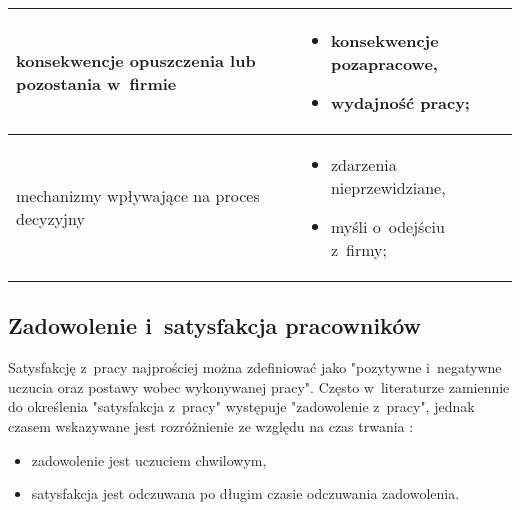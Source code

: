 \begin{minipage}{\textwidth}
\begin{table}[H]
\begin{center}
\begin{tabular}{|P{.2\textwidth}|P{.7\textwidth}|}
                         konsekwencje opuszczenia lub pozostania w~firmie &
                         \begin{itemize}
                             \item konsekwencje pozapracowe,
                             \item wydajność pracy;
                         \end{itemize} \\
                         \hline

                         mechanizmy wpływające na proces decyzyjny &
                         \begin{itemize}
                             \item zdarzenia nieprzewidziane,
                             \item myśli o~odejściu z~firmy;
                         \end{itemize} \\
                         \hline
                     \end{tabular}
                 \end{center}
                 \raggedright{}
                 \vspace{0.75cm}
             \end{table}
\end{minipage}


\subsection{Zadowolenie i~satysfakcja pracowników}\label{sec:czynniki-wplywajace-na-fluktuacje:zadowolenie}
Satysfakcję z~pracy najprościej można zdefiniować jako "pozytywne i~negatywne uczucia oraz postawy wobec wykonywanej pracy"\cite{shultz-2002}.
Często w~literaturze zamiennie do określenia "satysfakcja z~pracy" występuje "zadowolenie z~pracy", jednak czasem wskazywane jest rozróżnienie ze względu na czas trwania \cite{sowinska-2014}:
\begin{itemize}
    \item zadowolenie jest uczuciem chwilowym,
    \item satysfakcja jest odczuwana po długim czasie odczuwania zadowolenia.
\end{itemize}

